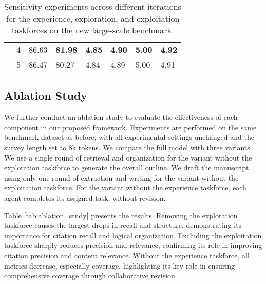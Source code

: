 \documentclass[manuscript,review,anonymous]{acmart}
\begin{document}
\begin{table}[h]
\begin{adjustbox}{width=\columnwidth}
\begin{tabular}{clllllll}
            & \cellcolor{gray!15}4 & \cellcolor{gray!15}86.63 & \cellcolor{gray!15}\textbf{81.98} & \cellcolor{gray!15}\textbf{4.85} & \cellcolor{gray!15}\textbf{4.90} & \cellcolor{gray!15}\textbf{5.00} & \cellcolor{gray!15}\textbf{4.92} \\
            & 5 & 86.47 & 80.27 & 4.84 & 4.89 & 5.00 & 4.91 \\
            \bottomrule
        \end{tabular}
    \end{adjustbox}
    \caption{Sensitivity experiments across different iterations for the experience, exploration, and exploitation taskforces on the new large-scale benchmark.}
    \label{tab:iteration_comparison}
\end{table}


\subsection{Ablation Study}
\label{sec:ablation_study}

We further conduct an ablation study to evaluate the effectiveness of each component in our proposed framework. Experiments are performed on the same benchmark dataset as before, with all experimental settings unchanged and the survey length set to 8k tokens. We compare the full model with three variants. We use a single round of retrieval and organization for the variant without the exploration taskforce to generate the overall outline. We draft the manuscript using only one round of extraction and writing for the variant without the exploitation taskforce. For the variant without the experience taskforce, each agent completes its assigned task, without revision.

Table \ref{tab:ablation_study} presents the results. Removing the exploration taskforce causes the largest drops in recall and structure, demonstrating its importance for citation recall and logical organization. Excluding the exploitation taskforce sharply reduces precision and relevance, confirming its role in improving citation precision and content relevance. Without the experience taskforce, all metrics decrease, especially coverage, highlighting its key role in ensuring comprehensive coverage through collaborative revision.
\end{document}
